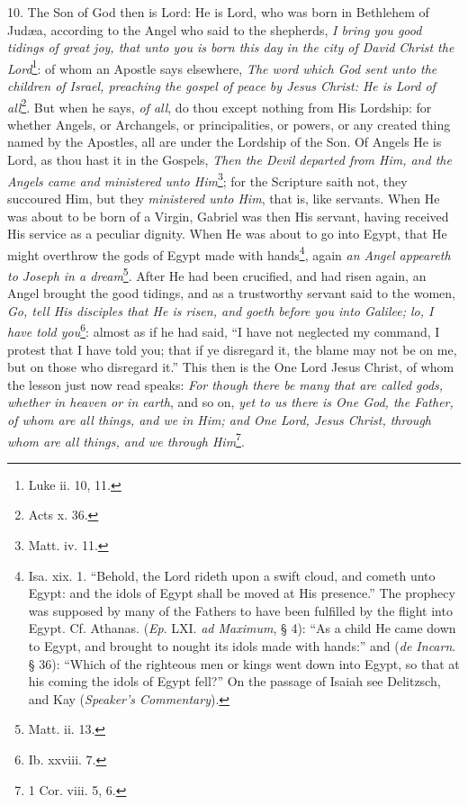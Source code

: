 10. The Son of God then is Lord: He is Lord, who was born in Bethlehem of Judæa, according to the Angel who said to the shepherds, \emph{I bring you good tidings of great joy, that unto you is born this day in the city of David Christ the Lord}\footnote{Luke ii. 10, 11.}: of whom an Apostle says elsewhere, \emph{The word which God sent unto the children of Israel, preaching the gospel of peace by Jesus Christ: He is Lord of all}\footnote{Acts x. 36.}. But when he says, \emph{of all}, do thou except nothing from His Lordship: for whether Angels, or Archangels, or principalities, or powers, or any created thing named by the Apostles, all are under the Lordship of the Son. Of Angels He is Lord, as thou hast it in the Gospels, \emph{Then the Devil departed from Him, and the Angels came and ministered unto Him}\footnote{Matt. iv. 11.}; for the Scripture saith not, they succoured Him, but they \emph{ministered unto Him}, that is, like servants. When He was about to be born of a Virgin, Gabriel was then His servant, having received His service as a peculiar dignity. When He was about to go into Egypt, that He might overthrow the gods of Egypt made with hands\footnote{Isa. xix. 1. “Behold, the Lord rideth upon a swift cloud, and cometh unto Egypt: and the idols of Egypt shall be moved at His presence.” The prophecy was supposed by many of the Fathers to have been fulfilled by the flight into Egypt. Cf. Athanas. (\emph{Ep}. LXI. \emph{ad Maximum}, § 4): “As a child He came down to Egypt, and brought to nought its idols made with hands:” and (\emph{de Incarn}. § 36): “Which of the righteous men or kings went down into Egypt, so that at his coming the idols of Egypt fell?” On the passage of Isaiah see Delitzsch, and Kay (\emph{Speaker’s Commentary}).}, again \emph{an Angel appeareth to Joseph in a dream}\footnote{Matt. ii. 13.}. After He had been crucified, and had risen again, an Angel brought the good tidings, and as a trustworthy servant said to the women, \emph{Go, tell His disciples that He is risen, and goeth before you into Galilee; lo, I have told you}\footnote{Ib. xxviii. 7.}: almost as if he had said, “I have not neglected my command, I protest that I have told you; that if ye disregard it, the blame may not be on me, but on those who disregard it.” This then is the One Lord Jesus Christ, of whom the lesson just now read speaks: \emph{For though there be many that are called gods, whether in heaven or in earth}, and so on, \emph{yet to us there is One God, the Father, of whom are all things, and we in Him; and One Lord, Jesus Christ, through whom are all things, and we through Him}\footnote{1 Cor. viii. 5, 6.}.

